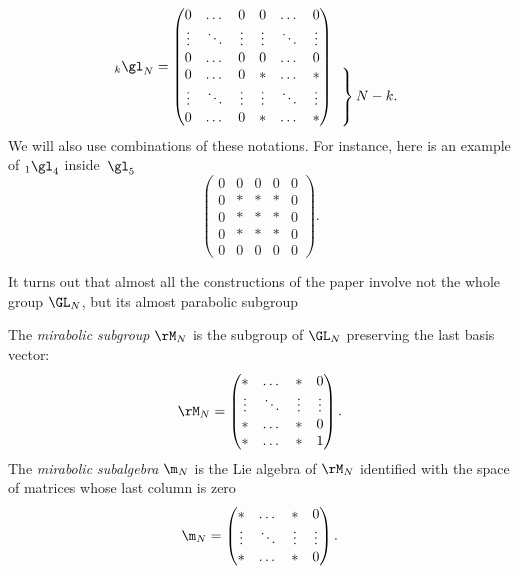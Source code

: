 	\[
	{}_k \gl_N = \begin{pmatrix}
		0 & \dots & 0 & 0 & \dots & 0 \\
		\vdots & \ddots & \vdots & \vdots & \ddots & \vdots \\
		0 & \dots & 0 & 0 & \dots & 0 \\
		0 & \dots & 0 & * & \dots & * \\
		\vdots & \ddots & \vdots & \vdots & \ddots & \vdots \\
		0 & \dots & 0 & * & \dots & *
	\end{pmatrix}
	\begin{array}{ c }
		\vphantom{\begin{array}{ c }
				b_N \\ %
				\vdots \\ %
				z_N %
		\end{array}} \\
		\left.\kern-\nulldelimiterspace
		\vphantom{\begin{array}{ c }
				b_N \\ %
				\vdots \\ %
				z_N %
		\end{array}}
		\right\}\text{$N-k$.}
	\end{array}
	\]
	We will also use combinations of these notations. For instance, here is an example of $ {}_1 \gl_4$ inside~$\gl_5$
	\[
	\begin{pmatrix}
		0 & 0 & 0 & 0 & 0 \\
		0 & * & * & * & 0 \\
		0 & * & * & * & 0 \\
		0 & * & * & * & 0 \\
		0& 0 & 0 & 0 & 0
	\end{pmatrix}.
	\]
	
	It turns out that almost all the constructions of the paper involve not the whole group $\GL_N$, but its almost parabolic subgroup
	\begin{Definition}
		The \emph{mirabolic subgroup} $\rM_N$ is the subgroup of $\GL_N$ preserving the last basis vector:
		\[
		\rM_N = \begin{pmatrix}
			* & \dots & * & 0 \\
			\vdots & \ddots & \vdots & \vdots \\
			* & \dots & * & 0 \\
			* & \dots & * & 1
		\end{pmatrix}.
		\]
		The \emph{mirabolic subalgebra} $\m_N$ is the Lie algebra of $\rM_N$ identified with the space of matrices whose last column is zero
		\[
		\m_N = \begin{pmatrix}
			* & \dots & * & 0 \\
			\vdots & \ddots & \vdots & \vdots \\
			* & \dots & * & 0 \\
		\end{pmatrix}.
		\]
	\end{Definition}
	
